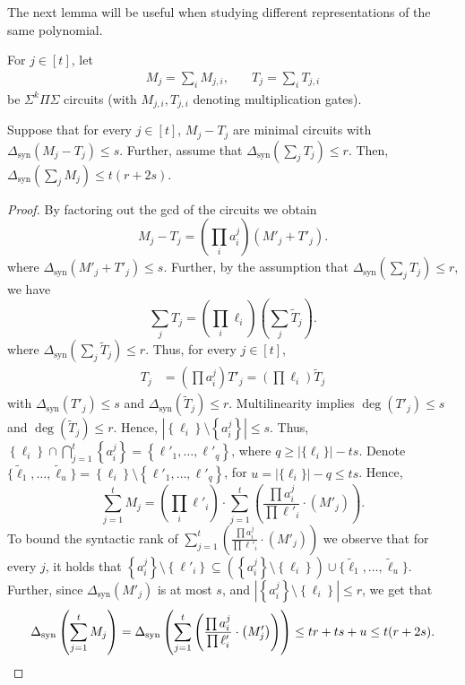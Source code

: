 \documentclass[12pt]{article}
\renewcommand{\set}[1]{\left\{ #1 \right\}}
\newcommand{\SumProdSumk}{\Sigma^k \Pi \Sigma}
\newcommand{\ranksyn}{\Delta_{\text{syn}}}
\begin{document}
	The next lemma will be useful when studying different representations of the same polynomial.
	
	\begin{lemma}
		\label{lem:small-syn-rank-t}
		For $j \in [t]$, let
		\begin{align*}
			M_j = \sum_i M_{j,i}, & \quad T_j = \sum_i T_{j,i}
		\end{align*}
		be $\SumProdSumk$ circuits (with $M_{j,i}, T_{j,i}$ denoting multiplication gates).
		
		Suppose that for every $j \in [t]$, $M_j - T_j$ are minimal circuits with
		$\ranksyn(M_j - T_j) \le s$. Further, assume that
		$\ranksyn(\sum_j T_j) \le r$.
		Then, $\ranksyn(\sum_j M_j) \le t(r+2s)$.
	\end{lemma}
	
	\begin{proof}
		By factoring out the gcd of the circuits we obtain
		\[
		M_j - T_j = \left( \prod_i a^j_i \right) (M'_j + T'_j).
		\]
		where $\ranksyn(M'_j + T'_j) \le s$.	
		Further, by the assumption that $\ranksyn(\sum_j T_j) \le r$, we have
		\[
		\sum_j T_j = \left( \prod_{i} \ell_i\right) (\sum_j \tilde{T}_j).
		\]
		where $\ranksyn(\sum_j \tilde{T}_j) \le r$.
		Thus, for every $j \in [t]$,
		\begin{align*}
			T_j &= \left( \prod a^j_i \right) T'_j = \left(\prod \ell_i \right) \tilde{T}_j
		\end{align*}
		with $\ranksyn(T'_j) \le s$ and $\ranksyn(\tilde{T}_j) \le r$. Multilinearity implies $\deg(T'_j)\le s$ and $\deg(\tilde{T}_j)\le r$. 
		Hence, $|\set{\ell_i} \setminus \set{a^j_i}| \le s$.
		Thus, $\set{\ell_i} \cap \bigcap_{j=1}^t \set{a^j_i} = \set{\ell'_1, \ldots, \ell'_q}$, where $q \geq |\{\ell_i\}| - ts$. Denote $\{\tilde{\ell}_1,\ldots,\tilde{\ell}_u\} = \set{\ell_i}\setminus\set{\ell'_1, \ldots, \ell'_q}$, for $u= |\{\ell_i\}| -q \leq ts$.
		Hence,
		\[
		\sum_{j=1}^t M_j = \left( \prod_i \ell'_i \right) \cdot
		\sum_{j=1}^t \left( \frac{\prod a^j_i}{\prod \ell'_i} \cdot \left(M'_j \right) \right).
		\]
		To bound the syntactic rank of $\sum_{j=1}^t \left( \frac{\prod a^j_i}{\prod \ell'_i} \cdot \left(M'_j \right) \right)$ we observe that for every $j$, it holds that $\set{a^j_i} \setminus \set{\ell'_i} \subseteq \left(\set{a^j_i} \setminus \set{\ell_i}\right) \cup \{\tilde{\ell}_1,\ldots,\tilde{\ell}_u\}$. 
		Further, since $\ranksyn(M'_j)$ is at most $s$, and  $|\set{a^j_i} \setminus \set{\ell_i}| \le r$, we get that
		\[
		\ranksyn \left( \sum_{j=1}^t M_j \right) =\ranksyn\left(\sum_{j=1}^t \left( \frac{\prod a^j_i}{\prod \ell'_i} \cdot \left(M'_j \right) \right)\right)\le t r + ts + u \leq t(r+2s). \qedhere
		\]
	\end{proof}
	
\end{document}

